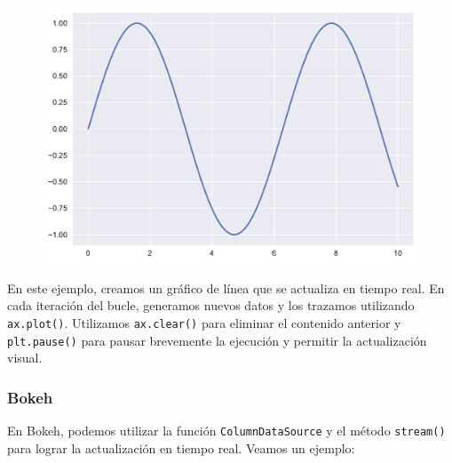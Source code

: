 \documentclass[
  a4paper,
]{article}
\begin{document}
\begin{figure}[H]

{\centering \includegraphics{index_files/figure-pdf/cell-22-output-1.pdf}

}

\end{figure}

En este ejemplo, creamos un gráfico de línea que se actualiza en tiempo
real. En cada iteración del bucle, generamos nuevos datos y los trazamos
utilizando \texttt{ax.plot()}. Utilizamos \texttt{ax.clear()} para
eliminar el contenido anterior y \texttt{plt.pause()} para pausar
brevemente la ejecución y permitir la actualización visual.

\hypertarget{bokeh}{%
\subsubsection{Bokeh}\label{bokeh}}

En Bokeh, podemos utilizar la función \texttt{ColumnDataSource} y el
método \texttt{stream()} para lograr la actualización en tiempo real.
Veamos un ejemplo:
\end{document}
